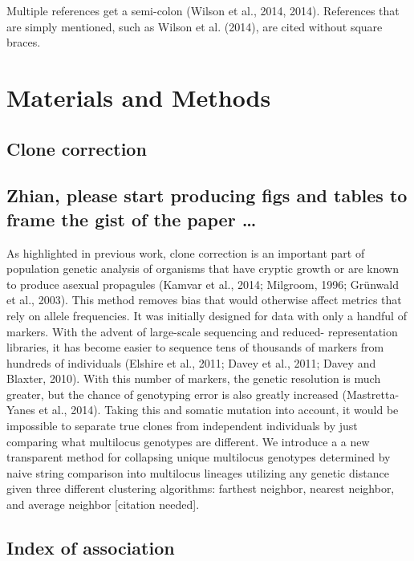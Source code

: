 \documentclass{frontiersSCNS} %
\begin{document}
Multiple references get a semi-colon (Wilson et al., 2014, 2014).
References that are simply mentioned, such as Wilson et al. (2014), are
cited without square braces.

\section*{Materials and Methods}\label{materials-and-methods}

\subsection*{Clone correction}\label{clone-correction}

\subsection{Zhian, please start producing figs and tables to frame the
gist of the paper
\ldots{}}\label{zhian-please-start-producing-figs-and-tables-to-frame-the-gist-of-the-paper}

As highlighted in previous work, clone correction is an important part
of population genetic analysis of organisms that have cryptic growth or
are known to produce asexual propagules (Kamvar et al., 2014; Milgroom,
1996; Grünwald et al., 2003). This method removes bias that would
otherwise affect metrics that rely on allele frequencies. It was
initially designed for data with only a handful of markers. With the
advent of large-scale sequencing and reduced- representation libraries,
it has become easier to sequence tens of thousands of markers from
hundreds of individuals (Elshire et al., 2011; Davey et al., 2011; Davey
and Blaxter, 2010). With this number of markers, the genetic resolution
is much greater, but the chance of genotyping error is also greatly
increased (Mastretta-Yanes et al., 2014). Taking this and somatic
mutation into account, it would be impossible to separate true clones
from independent individuals by just comparing what multilocus genotypes
are different. We introduce a a new transparent method for collapsing
unique multilocus genotypes determined by naive string comparison into
multilocus lineages utilizing any genetic distance given three different
clustering algorithms: farthest neighbor, nearest neighbor, and average
neighbor {[}citation needed{]}.

\subsection*{Index of association}\label{index-of-association}
\end{document}

